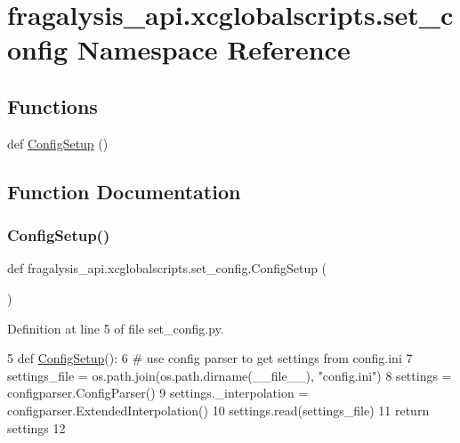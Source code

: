 \hypertarget{namespacefragalysis__api_1_1xcglobalscripts_1_1set__config}{}\section{fragalysis\+\_\+api.\+xcglobalscripts.\+set\+\_\+config Namespace Reference}
\label{namespacefragalysis__api_1_1xcglobalscripts_1_1set__config}
\subsection*{Functions}
\begin{DoxyCompactItemize}
\item 
def \hyperlink{namespacefragalysis__api_1_1xcglobalscripts_1_1set__config_a9b5445f82604ad45c1e85e2b07e4a317}{Config\+Setup} ()
\end{DoxyCompactItemize}


\subsection{Function Documentation}
\mbox{\label{namespacefragalysis__api_1_1xcglobalscripts_1_1set__config_a9b5445f82604ad45c1e85e2b07e4a317}} 
\subsubsection{\texorpdfstring{Config\+Setup()}{ConfigSetup()}}
{\footnotesize\ttfamily def fragalysis\+\_\+api.\+xcglobalscripts.\+set\+\_\+config.\+Config\+Setup (\begin{DoxyParamCaption}{ }\end{DoxyParamCaption})}



Definition at line 5 of file set\+\_\+config.\+py.


\begin{DoxyCode}
5 \textcolor{keyword}{def }\hyperlink{namespacefragalysis__api_1_1xcglobalscripts_1_1set__config_a9b5445f82604ad45c1e85e2b07e4a317}{ConfigSetup}():
6     \textcolor{comment}{# use config parser to get settings from config.ini}
7     settings\_file = os.path.join(os.path.dirname(\_\_file\_\_), \textcolor{stringliteral}{"config.ini"})
8     settings = configparser.ConfigParser()
9     settings.\_interpolation = configparser.ExtendedInterpolation()
10     settings.read(settings\_file)
11     \textcolor{keywordflow}{return} settings
12 \end{DoxyCode}
